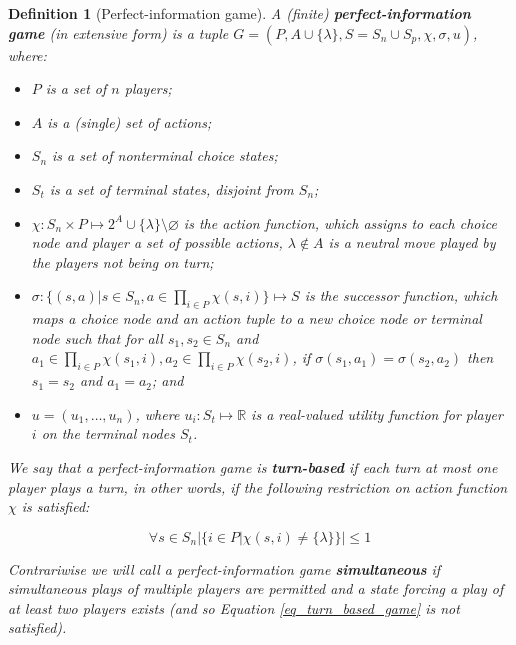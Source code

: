 \newtheorem*{defgpig}{Definition}
\begin{defgpig}[Perfect-information game]

A (finite) \textbf{perfect-information game} (in extensive form) is a tuple $G =
(P,A\cup\{\lambda\},S=S_n\cup S_p,\chi,\sigma,u)$, where:

\begin{itemize}

\item $P$ is a set of $n$ players;

\item $A$ is a (single) set of actions;

\item $S_n$ is a set of nonterminal choice states;

\item $S_t$ is a set of terminal states, disjoint from $S_n$;

\item $\chi: S_n \times P \mapsto 2^A \cup \{\lambda\} \setminus \varnothing$ is the action 
 function, which assigns to each choice node and player a set of possible actions, $\lambda \notin
 A$ is a neutral move played by the players not being on turn;

\item $\sigma: \{(s,a)| s \in S_n, a \in \prod\limits_{i\in P}\chi(s,i)\} \mapsto S$ is the
successor function, which maps a choice node and an action tuple to a new choice node or
terminal node such that for all $s_1, s_2 \in S_n$ and $a_1 \in \prod\limits_{i\in
P}\chi(s_1,i), a_2 \in \prod\limits_{i\in P}\chi(s_2,i)$, if 
$\sigma(s_1,a_1) = \sigma(s_2,a_2)$ then $s_1=s_2$ and $a_1=a_2$; and

\item $u = (u_1,\ldots,u_n)$, where $u_i: S_t \mapsto \mathbb{R}$ is a real-valued utility
function for player $i$ on the terminal nodes $S_t$.

\end{itemize}

We say that a perfect-information game is \textbf{turn-based} if each turn at most one player plays a
turn, in other words, if the following restriction on action function $\chi$ is satisfied:

\begin{equation}
\label{eq_turn_based_game}
\forall s \in S_n |\{i \in P|\chi(s,i) \not= \{\lambda\}\}| \le 1
\end{equation}

Contrariwise we will call a perfect-information game \textbf{simultaneous} if simultaneous
plays of multiple players are permitted and a state forcing a play of at least two players
exists (and so Equation \ref{eq_turn_based_game} is not satisfied).

\end{defgpig}

